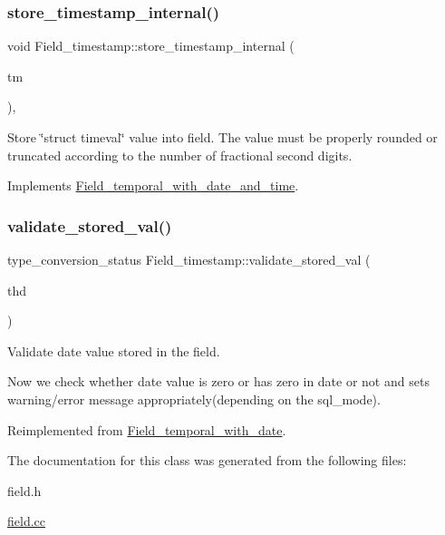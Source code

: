\subsubsection{\texorpdfstring{store\+\_\+timestamp\+\_\+internal()}{store\_timestamp\_internal()}}
{\footnotesize\ttfamily void Field\+\_\+timestamp\+::store\+\_\+timestamp\+\_\+internal (\begin{DoxyParamCaption}\item[{const struct timeval $\ast$}]{tm }\end{DoxyParamCaption})\hspace{0.3cm}{\ttfamily [protected]}, {\ttfamily [virtual]}}

Store \char`\"{}struct timeval\char`\"{} value into field. The value must be properly rounded or truncated according to the number of fractional second digits. 

Implements \mbox{\hyperlink{classField__temporal__with__date__and__time_a3cfd6dc59b102362d592341dbf40a19e}{Field\+\_\+temporal\+\_\+with\+\_\+date\+\_\+and\+\_\+time}}.

\mbox{\label{classField__timestamp_ac6253aa19d757ba5607be97fbbefe02a}} 
\subsubsection{\texorpdfstring{validate\+\_\+stored\+\_\+val()}{validate\_stored\_val()}}
{\footnotesize\ttfamily type\+\_\+conversion\+\_\+status Field\+\_\+timestamp\+::validate\+\_\+stored\+\_\+val (\begin{DoxyParamCaption}\item[{T\+HD $\ast$}]{thd }\end{DoxyParamCaption})\hspace{0.3cm}{\ttfamily [virtual]}}

Validate date value stored in the field.

Now we check whether date value is zero or has zero in date or not and sets warning/error message appropriately(depending on the sql\+\_\+mode). 

Reimplemented from \mbox{\hyperlink{classField__temporal__with__date_af9ebe4d96a6a81232e4a41e4b1d7b599}{Field\+\_\+temporal\+\_\+with\+\_\+date}}.



The documentation for this class was generated from the following files\+:\begin{DoxyCompactItemize}
\item 
field.\+h\item 
\mbox{\hyperlink{field_8cc}{field.\+cc}}\end{DoxyCompactItemize}
